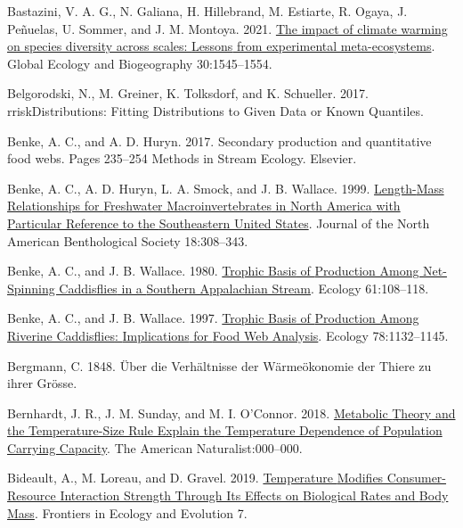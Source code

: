 \documentclass[
]{article}
\newlength{\cslhangindent}
\newlength{\cslentryspacingunit} %
\newenvironment{CSLReferences}[2] %
 {%
  \setlength{\parindent}{0pt}
  \ifodd #1
  \let\oldpar\par
  \def\par{\hangindent=\cslhangindent\oldpar}
  \fi
  \setlength{\parskip}{#2\cslentryspacingunit}
 }%
 {}
\numberwithin{equation}
\begin{document}
\begin{CSLReferences}{1}{0}
\leavevmode{}%
Bastazini, V. A. G., N. Galiana, H. Hillebrand, M. Estiarte, R. Ogaya,
J. Peñuelas, U. Sommer, and J. M. Montoya. 2021.
\href{https://doi.org/10.1111/geb.13308}{The impact of climate warming
on species diversity across scales: {Lessons} from experimental
meta-ecosystems}. Global Ecology and Biogeography 30:1545--1554.

\leavevmode{}%
Belgorodski, N., M. Greiner, K. Tolksdorf, and K. Schueller. 2017.
{rriskDistributions}: {Fitting Distributions} to {Given Data} or {Known
Quantiles}.

\leavevmode{}%
Benke, A. C., and A. D. Huryn. 2017. Secondary production and
quantitative food webs. Pages 235--254 Methods in {Stream Ecology}.
Elsevier.

\leavevmode{}%
Benke, A. C., A. D. Huryn, L. A. Smock, and J. B. Wallace. 1999.
\href{https://doi.org/10.2307/1468447}{Length-{Mass Relationships} for
{Freshwater Macroinvertebrates} in {North America} with {Particular
Reference} to the {Southeastern United States}}. Journal of the North
American Benthological Society 18:308--343.

\leavevmode{}%
Benke, A. C., and J. B. Wallace. 1980.
\href{https://doi.org/10.2307/1937161}{Trophic {Basis} of {Production
Among Net-Spinning Caddisflies} in a {Southern Appalachian Stream}}.
Ecology 61:108--118.

\leavevmode{}%
Benke, A. C., and J. B. Wallace. 1997.
\href{https://doi.org/10.1890/0012-9658(1997)078\%5B1132:TBOPAR\%5D2.0.CO;2}{Trophic
{Basis} of {Production Among Riverine Caddisflies}: {Implications} for
{Food Web Analysis}}. Ecology 78:1132--1145.

\leavevmode{}%
Bergmann, C. 1848. {Ü}ber die {Verh{ä}ltnisse} der {W{ä}rme{ö}konomie}
der {Thiere} zu ihrer {Gr{ö}sse}.

\leavevmode{}%
Bernhardt, J. R., J. M. Sunday, and M. I. O'Connor. 2018.
\href{https://doi.org/10.1086/700114}{Metabolic {Theory} and the
{Temperature-Size Rule Explain} the {Temperature Dependence} of
{Population Carrying Capacity}}. The American Naturalist:000--000.

\leavevmode{}%
Bideault, A., M. Loreau, and D. Gravel. 2019.
\href{https://doi.org/10.3389/fevo.2019.00045}{Temperature {Modifies
Consumer-Resource Interaction Strength Through Its Effects} on
{Biological Rates} and {Body Mass}}. Frontiers in Ecology and Evolution
7.


\end{CSLReferences}
\end{document}
